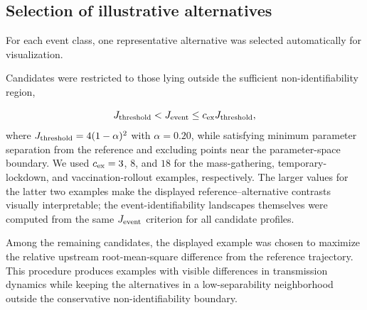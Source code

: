 \subsection{Selection of illustrative alternatives}

For each event class, one representative alternative was selected automatically for visualization.

Candidates were restricted to those lying outside the sufficient non-identifiability region,

\[
J_{\rm threshold}
<
J_{\rm event}
\le
c_{\rm ex}J_{\rm threshold},
\]
where \(J_{\rm threshold}=4(1-\alpha)^2\) with \(\alpha=0.20\), while satisfying minimum parameter separation from the reference and excluding points near the parameter-space boundary.
We used \(c_{\rm ex}=3\), \(8\), and \(18\) for the mass-gathering, temporary-lockdown, and vaccination-rollout examples, respectively. The larger values for the latter two examples make the displayed reference--alternative contrasts visually interpretable; the event-identifiability landscapes themselves were computed from the same \(J_{\rm event}\) criterion for all candidate profiles.

Among the remaining candidates, the displayed example was chosen to maximize the relative upstream root-mean-square difference from the reference trajectory. This procedure produces examples with visible differences in transmission dynamics while keeping the alternatives in a low-separability neighborhood outside the conservative non-identifiability boundary.
